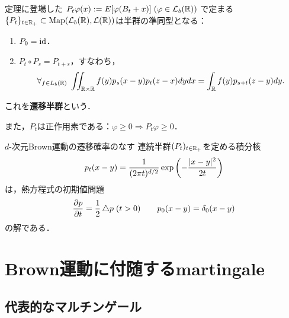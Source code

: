 \documentclass[uplatex,dvipdfmx]{jsreport}
\begin{document}
\begin{definition}
    定理に登場した
    $P_t\varphi(x):=E[\varphi(B_t+x)]\;(\varphi\in \mathcal{L}_b(\mathbb{R}))$
    で定まる$\{P_t\}_{t\in\mathbb{R}_+}\subset\mathrm{Map}(\mathcal{L}_b(\mathbb{R}),\mathcal{L}(\mathbb{R}))$は半群の準同型となる：
    \begin{enumerate}
        \item $P_0=\mathrm{id}$．
        \item $P_t\circ P_s=P_{t+s}$，すなわち，
        \[\forall_{f\in L_b(\mathbb{R})}\;\iint_{\mathbb{R}\times\mathbb{R}} f(y)p_s(x-y)p_t(z-x)dydx=\int_{\mathbb{R}} f(y)p_{s+t}(z-y)dy.\]
    \end{enumerate}
    これを\textbf{遷移半群}という．
    
    また，$P_t$は正作用素である：$\varphi\ge0\Rightarrow P_t\varphi\ge0$．
\end{definition}


\begin{proposition}[Brown運動の遷移半群が満たす偏微分方程式]
    $d$-次元Brown運動の遷移確率のなす
    連続半群$(P_t)_{t\in\mathbb{R}_+}$を定める積分核
    \[p_t(x-y)=\frac{1}{(2\pi t)^{d/2}}\exp\left(-\frac{\lvert x-y\rvert^2}{2t}\right)\]
    は，熱方程式の初期値問題
    \[\frac{\partial p}{\partial t}=\frac{1}{2}\mathop{}\!\mathbin\bigtriangleup p\;(t>0)\qquad p_0(x-y)=\delta_0(x-y)\]
    の解である．
\end{proposition}

\section{Brown運動に付随するmartingale}

\subsection{代表的なマルチンゲール}
\end{document}
